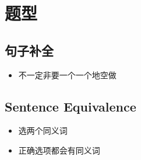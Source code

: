 \chapter{题型}

\section{句子补全}

  \begin{itemize}
    \item 不一定非要一个一个地空做
  \end{itemize}

\section{Sentence Equivalence}

  \begin{itemize}
    \item 选两个同义词
    \item 正确选项都会有同义词
  \end{itemize}
